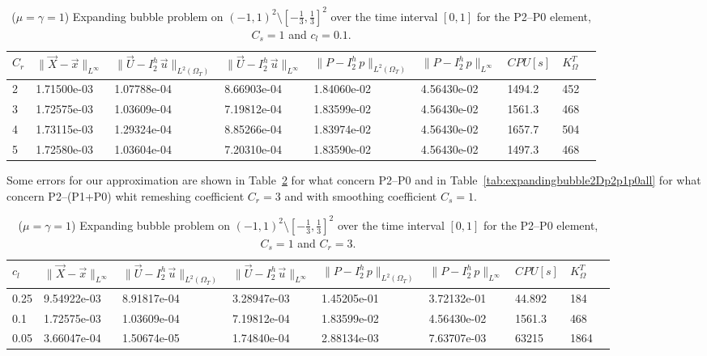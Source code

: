 \documentclass[a4paper,12pt,onecolumn]{article}
\newcommand{\errorXx}{\|\vec{X} - \vec{x}\|_{L^\infty}}
\newcommand{\LerrorUu}[1]{\|\vec U - I^h_{#1}\,\vec u\|_{L^2(\Omega_T)}}
\newcommand{\errorUu}[1]{\|\vec U - I^h_{#1}\,\vec u\|_{L^\infty}}
\newcommand{\errorPp}[1]{\|P - I^h_{#1}\,p\|_{L^\infty}}
\newcommand{\LerrorPp}[1]{\|P - I^h_{#1}\,p\|_{L^2(\Omega_T)}}
\begin{document}
\begin{table}
 \center
 \hspace*{-2cm}
\begin{tabular}{lllllllll}
\hline
$C_r$ & $\errorXx$ & $\LerrorUu2$ & $\errorUu2$ & $\LerrorPp2$ & $\errorPp2$ & $CPU[s]$ & $K_\Omega^T$\\
\hline
2 & 1.71500e-03 & 1.07788e-04 & 8.66903e-04 & 1.84060e-02 & 4.56430e-02 & 1494.2 & 452\\
3 & 1.72575e-03 & 1.03609e-04 & 7.19812e-04 & 1.83599e-02 & 4.56430e-02 & 1561.3 & 468\\
4 & 1.73115e-03 & 1.29324e-04 & 8.85266e-04 & 1.83974e-02 & 4.56430e-02 & 1657.7 & 504\\
5 & 1.72580e-03 & 1.03604e-04 & 7.20310e-04 & 1.83590e-02 & 4.56430e-02 & 1497.3 & 468\\
\hline
\end{tabular}
\hspace*{-2cm}
\caption{($\mu=\gamma=1$) Expanding bubble problem on $(-1,1)^2\setminus[-\frac{1}{3},\frac{1}{3}]^2$ over the time interval $[0,1]$ for the P2--P0 element, $C_s=1$ and $c_l=0.1$.}
\label{tab:expandingbubble2Dp2p0bothdiffcr}
\end{table}

Some errors for our approximation are shown in Table~\ref{tab:expandingbubble2Dp2p0all} for what concern P2--P0 and in Table~\ref{tab:expandingbubble2Dp2p1p0all} for what concern P2--(P1+P0) whit remeshing coefficient $C_r=3$ and with smoothing coefficient $C_s=1$.

\begin{table}
 \center
 \hspace*{-2cm}
\begin{tabular}{lllllllll}
\hline
$c_l$ & $\errorXx$ & $\LerrorUu2$ & $\errorUu2$ & $\LerrorPp2$ & $\errorPp2$ & $CPU[s]$ & $K_\Omega^T$\\
\hline
0.25 & 9.54922e-03 & 8.91817e-04 & 3.28947e-03 & 1.45205e-01 & 3.72132e-01 & 44.892 & 184\\
0.1 & 1.72575e-03 & 1.03609e-04 & 7.19812e-04 & 1.83599e-02 & 4.56430e-02 & 1561.3 & 468\\
0.05 & 3.66047e-04 & 1.50674e-05 & 1.74840e-04 & 2.88134e-03 & 7.63707e-03 & 63215 & 1864\\
\hline
\end{tabular}
\hspace*{-2cm}
\caption{($\mu=\gamma=1$) Expanding bubble problem on $(-1,1)^2\setminus[-\frac{1}{3},\frac{1}{3}]^2$ over the time interval $[0,1]$ for the P2--P0 element, $C_s=1$ and $C_r=3$.}
\label{tab:expandingbubble2Dp2p0all}
\end{table}
\end{document}
